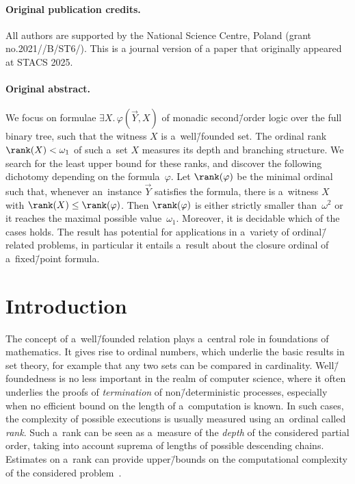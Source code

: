 \paragraph{Original publication credits.} All authors are supported by the National Science Centre, Poland (grant no.\@ 2021//\allowbreak B/\allowbreak ST6/). This is a journal version of a paper that originally appeared at STACS 2025.
\paragraph{Original abstract.} 
	We focus on formulae $\exists X.\, \varphi(\vec{Y}, X)$ of monadic second\=/order logic over the full binary tree, such that the witness $X$ is a~well\=/founded set.
	The ordinal rank $\rank(X) < \omega_1$ of such a~set $X$ measures its depth and branching structure.
	We search for the least upper bound for these ranks, and discover the following dichotomy depending on the formula~$\varphi$.
	Let $\rank(\varphi)$ be the minimal ordinal such that, whenever an~instance $\vec{Y}$ satisfies the formula, there is a~witness $X$ with $\rank(X) \leq \rank(\varphi)$.
	Then $\rank(\varphi)$ is either strictly smaller than~$\omega^2$ or it reaches the maximal possible value~$\omega_1$.
	Moreover, it is decidable which of the cases holds.
	The result has potential for applications in a~variety of ordinal\=/related problems, in particular it entails a~result about the closure ordinal of a~fixed\=/point formula.


\section{Introduction}
\label{sec:intro}

The concept of a~well\=/founded relation plays a~central role in foundations of mathematics.
It gives rise to ordinal numbers, which underlie the basic results in set theory, for example that any two sets can be compared in cardinality.
Well\=/foundedness is no less important in the realm of computer science, where it often underlies the proofs of \emph{termination} of non\=/deterministic processes,
especially when no efficient bound on the length of a~computation is known.
In such cases, the complexity of possible executions is usually measured using an~ordinal called \emph{rank}.
Such a~rank can be seen as a~measure of the \emph{depth} of the considered partial order, taking into account suprema of lengths of possible descending chains.
Estimates on a~rank can provide upper\=/bounds on the computational complexity of the considered problem~\cite{schmitz_hab}.


